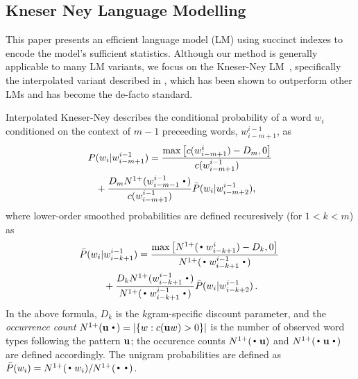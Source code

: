 
\subsection{Kneser Ney Language Modelling}
\label{sec-lm}


This paper presents an efficient \ngram language model (LM) using succinct indexes to encode the model's sufficient statistics. %
Although our method is generally applicable to many LM variants, 
we focus on the Kneser-Ney LM~\cite{kneser1995improved}, 
specifically the interpolated variant described in , 
which has been shown to outperform other \ngram LMs and has become the de-facto standard.

Interpolated Kneser-Ney describes the conditional probability of a word $w_i$ conditioned on the context of $m-1$ preceeding words, $w_{i-m+1}^{i-1}$, as 
\begin{align}
P(w_i |& w_{i-m+1}^{i-1})=\frac{\max\left[c(w^{i}_{i-m+1}) - D_m,0\right]}{c(w^{i-1}_{i-m+1})} \nonumber \\
& \hspace{-6mm} +\frac{D_m \nlplus{w^{i-1}_{i-m-1}\Bigcdot} }{c(w^{i-1}_{i-m+1})}  
\bar{P}(w_i | w_{i-m+2}^{i-1}) ,  
\label{eq:high}
\end{align}
where lower-order smoothed probabilities are defined recuresively (for $1<k<m$) as 
\begin{align}
\! \bar{P}(w_i |& w_{i-k+1}^{i-1})
 = \frac{\max\left[\nlplus{\Bigcdot w_{i-k+1}^{i}} - D_k,0\right]}{\nlplus{\Bigcdot w_{i-k+1}^{i-1} \Bigcdot}} \nonumber \\
&+ \frac{D_k \nlplus{w_{i-k+1}^{i-1}\Bigcdot}}{\nlplus{\Bigcdot w_{i-k+1}^{i-1} \Bigcdot}} \bar{P}(w_i | w_{i-k+2}^{i-1}) \,  . \! \label{eq:mid}
\end{align}
In the above formula, $D_k$ is the $k$gram-specific discount parameter, and 
the \emph{occurrence count} 
\mbox{$\nlplus{\uu\Bigcdot} = |\{w: c(\uu w)>0\}|$} 
is the number of observed word types following the pattern ${\mathbf{u}}$; 
the occurence counts $\nlplus{\Bigcdot\uu}$ and $\nlplus{\Bigcdot\uu\Bigcdot}$ 
are defined accordingly.
The unigram probabilities are defined as
%
$ \bar{P}(w_i) = \nlplus{\Bigcdot w_i} / \nlplus{\Bigcdot\Bigcdot}$.

